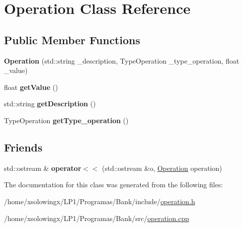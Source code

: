 \hypertarget{classOperation}{}\section{Operation Class Reference}
\label{classOperation}
\subsection*{Public Member Functions}
\begin{DoxyCompactItemize}
\item 
\mbox{\label{classOperation_a2b8a8d86b297a45c1a677cc3d7af9174}} 
{\bfseries Operation} (std\+::string \+\_\+description, Type\+Operation \+\_\+type\+\_\+operation, float \+\_\+value)
\item 
\mbox{\label{classOperation_a9b2a4bda36bca3b14c5b76e8f6a47d93}} 
float {\bfseries get\+Value} ()
\item 
\mbox{\label{classOperation_a6ab35e3b17952fcb981d7b8768b15f3d}} 
std\+::string {\bfseries get\+Description} ()
\item 
\mbox{\label{classOperation_a7fc75204f0374b316b16f410398dd62b}} 
Type\+Operation {\bfseries get\+Type\+\_\+operation} ()
\end{DoxyCompactItemize}
\subsection*{Friends}
\begin{DoxyCompactItemize}
\item 
\mbox{\label{classOperation_a2595e2d474930011c8adb05ccfd16ea4}} 
std\+::ostream \& {\bfseries operator$<$$<$} (std\+::ostream \&o, \hyperlink{classOperation}{Operation} operation)
\end{DoxyCompactItemize}


The documentation for this class was generated from the following files\+:\begin{DoxyCompactItemize}
\item 
/home/xsolowingx/\+L\+P1/\+Programas/\+Bank/include/\hyperlink{operation_8h}{operation.\+h}\item 
/home/xsolowingx/\+L\+P1/\+Programas/\+Bank/src/\hyperlink{operation_8cpp}{operation.\+cpp}\end{DoxyCompactItemize}
